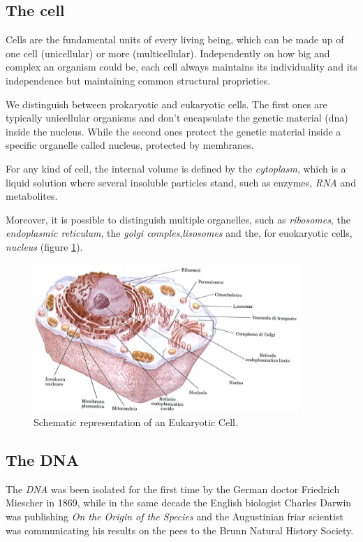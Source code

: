 \subsection{The cell}
\label{sec:cell}
Cells are the fundamental units of every living being, which can be made up of one cell (unicellular) or more (multicellular).
Independently on how big and complex an organism could be, each cell always maintains its individuality and its independence but maintaining common structural proprieties.

We distinguish between prokaryotic and eukaryotic cells. 
The first ones are typically unicellular organisms and don't encapsulate the genetic material (\gls{dna}) inside the nucleus.
While the second ones protect the genetic material inside a specific organelle called nucleus, protected by membranes.

For any kind of cell, the internal volume is defined by the \textit{cytoplasm}, which is a liquid solution where several insoluble particles stand, such as enzymes, \textit{RNA} and metabolites.

Moreover, it is possible to distinguish multiple organelles, such as \textit{ribosomes}, the \textit{endoplasmic reticulum}, the \textit{golgi comples},\textit{lisosomes} and the, for euokaryotic cells, \textit{nucleus} (figure \ref{fig:cell}).

\begin{figure}[h]
\centering
\includegraphics[width=10cm, keepaspectratio]{img/intro/cell.png}
\caption[The Cell]{Schematic representation of an Eukaryotic Cell.}
\label{fig:cell}
\end{figure}

\subsection{The DNA}
\label{sec:genica}
The \textit{DNA} was been isolated for the first time by the German doctor Friedrich Miescher in 1869, while in the same decade the English biologist Charles Darwin was publishing \textit{On the Origin of the Species} and the  Augustinian friar scientist was communicating his results on the pees to the Brunn Natural History Society.

